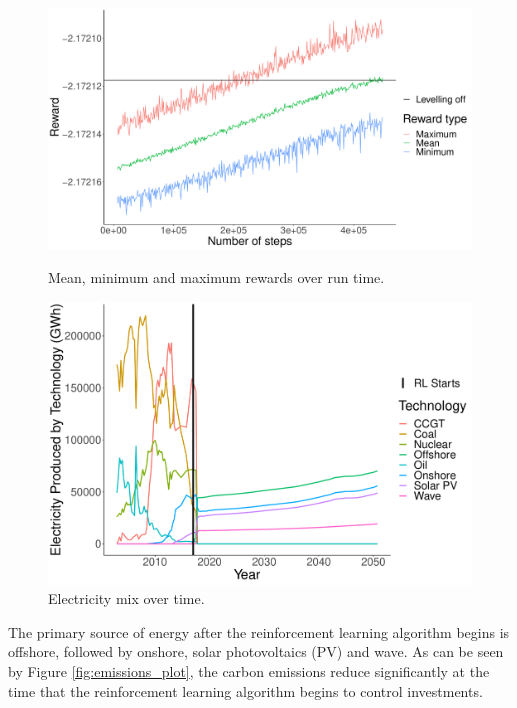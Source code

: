 \begin{figure}
	\centering
	\begin{minipage}{.4\textwidth}
		\centering
		\includegraphics[width=\linewidth]{Appendix1/figures/runtime_steps_plot.pdf}
		\caption{Mean, minimum and maximum rewards over run time.}
		\label{fig:days_reward_plot}
	\end{minipage}%
	\begin{minipage}{.4\textwidth}
		\centering
		\includegraphics[width=\linewidth]{Appendix1/figures/electricity_generated_plot.pdf}
		\caption{Electricity mix over time.}
		\label{fig:electricity_generated_plot}
	\end{minipage}
\end{figure}

The primary source of energy after the reinforcement learning algorithm begins is offshore, followed by onshore, solar photovoltaics (PV) and wave. As can be seen by Figure \ref{fig:emissions_plot}, the carbon emissions reduce significantly at the time that the reinforcement learning algorithm begins to control investments. 

